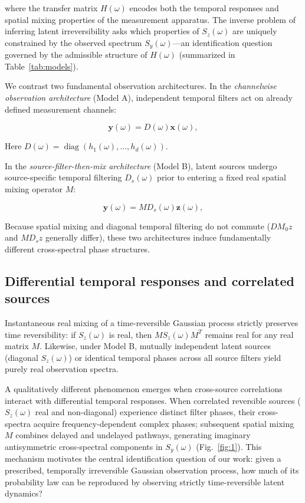 \documentclass[aps,pre,reprint,amsmath,amssymb,superscriptaddress]{revtex4-2}
\begin{document}
where the transfer matrix $H(\omega)$ encodes both the temporal responses and spatial mixing properties of the measurement apparatus. The inverse problem of inferring latent irreversibility asks which properties of $S_z(\omega)$ are uniquely constrained by the observed spectrum $S_y(\omega)$---an identification question governed by the admissible structure of $H(\omega)$ (summarized in Table~\ref{tab:models}).

We contrast two fundamental observation architectures. In the \emph{channelwise observation architecture} (Model A), independent temporal filters act on already defined measurement channels:

\begin{equation}\label{eq:4}
\boxed{
\mathbf y(\omega)
=
D(\omega)\mathbf x(\omega),
}
\end{equation}



Here $D(\omega)=\operatorname{diag}(h_1(\omega),\ldots,h_d(\omega))$.

In the \emph{source-filter-then-mix architecture} (Model B), latent sources undergo source-specific temporal filtering $D_s(\omega)$ prior to entering a fixed real spatial mixing operator $M$:

\begin{equation}\label{eq:5}
\boxed{
\mathbf y(\omega)
=
M D_s(\omega)\mathbf z(\omega),
}
\end{equation}



Because spatial mixing and diagonal temporal filtering do not commute ($D M_0 z$ and $M D_s z$ generally differ), these two architectures induce fundamentally different cross-spectral phase structures.

\subsection{Differential temporal responses and correlated sources}

Instantaneous real mixing of a time-reversible Gaussian process strictly preserves time reversibility: if $S_z(\omega)$ is real, then $M S_z(\omega) M^T$ remains real for any real matrix $M$. Likewise, under Model B, mutually independent latent sources (diagonal $S_z(\omega)$) or identical temporal phases across all source filters yield purely real observation spectra.

A qualitatively different phenomenon emerges when cross-source correlations interact with differential temporal responses. When correlated reversible sources ($S_z(\omega)$ real and non-diagonal) experience distinct filter phases, their cross-spectra acquire frequency-dependent complex phases; subsequent spatial mixing $M$ combines delayed and undelayed pathways, generating imaginary antisymmetric cross-spectral components in $S_y(\omega)$ (Fig.~\ref{fig:1}). This mechanism motivates the central identification question of our work: given a prescribed, temporally irreversible Gaussian observation process, how much of its probability law can be reproduced by observing strictly time-reversible latent dynamics?
\end{document}
